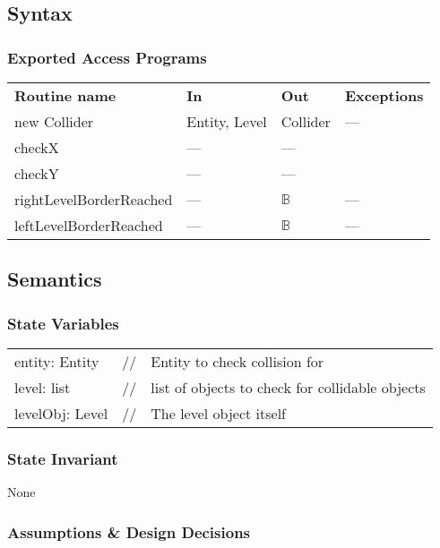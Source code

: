 \documentclass[12pt]{article}
\begin{document}
\subsection* {Syntax}

\subsubsection* {Exported Access Programs}

\begin{tabular}{| l | l | l | l |}
\hline
\textbf{Routine name} & \textbf{In} & \textbf{Out} & \textbf{Exceptions}\\
new Collider & Entity, Level & Collider & ---\\
\hline
checkX & --- & --- &\\
\hline
checkY & --- & --- &\\
\hline
rightLevelBorderReached & --- & $\mathbb{B}$ & ---\\
\hline
leftLevelBorderReached & --- & $\mathbb{B}$ & ---\\
\hline
\end{tabular}

\subsection* {Semantics}

\subsubsection* {State Variables}

\begin{tabular}{lll}
    entity: Entity & // & Entity to check collision for \\
    level: list & // & list of objects to check for collidable objects \\
    levelObj: Level & // & The level object itself
\end{tabular}

\subsubsection* {State Invariant}

None

\subsubsection* {Assumptions \& Design Decisions}
\end{document}
